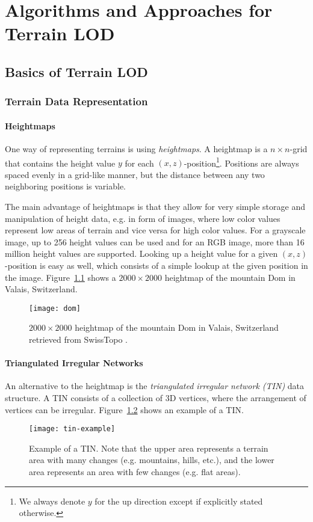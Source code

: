 \chapter{Algorithms and Approaches for Terrain LOD}
\section{Basics of Terrain LOD}
\subsection{Terrain Data Representation}
\subsubsection{Heightmaps}
One way of representing terrains is using \textit{heightmaps}.
A heightmap is a $n\times n$-grid that contains 
the height value $y$ for each $(x,z)$-position\footnote{We always denote $y$ for the up direction except if explicitly stated otherwise.}.
Positions are always spaced evenly in a grid-like manner,
but the distance between any two neighboring positions is variable.

The main advantage of heightmaps is that they allow for very simple storage and manipulation of height data, e.g. in form of images,
where low color values represent low areas of terrain and vice versa for
high color values. For a grayscale image, up to 256 height values can be used and for an RGB image,
more than 16 million height values are supported.
Looking up a height value for a given $(x,z)$-position is easy as well,
which consists of a simple lookup at the given position in the image.
Figure~\ref{fig:dom} shows a $2000 \times 2000$ heightmap of the mountain Dom in Valais, Switzerland.
\begin{figure}
  \centering
  \texttt{[image: dom]}
  \caption{$2000 \times 2000$ heightmap of the mountain Dom in Valais, Switzerland retrieved from SwissTopo \cite{alti3d}.}\label{fig:dom}
\end{figure}

\subsubsection{Triangulated Irregular Networks}
An alternative to the heightmap is the \textit{triangulated irregular network (TIN)} data structure.
A TIN consists of a collection of 3D vertices, where 
the arrangement of vertices can be irregular. Figure~\ref{fig:tin-example} shows 
an example of a TIN.
\begin{figure}
  \centering
  \texttt{[image: tin-example]}
  \caption{Example of a TIN. Note that the upper area represents a terrain area with many changes 
  (e.g. mountains, hills, etc.), and the lower area represents an area with few changes (e.g. flat areas).}\label{fig:tin-example}
\end{figure}


